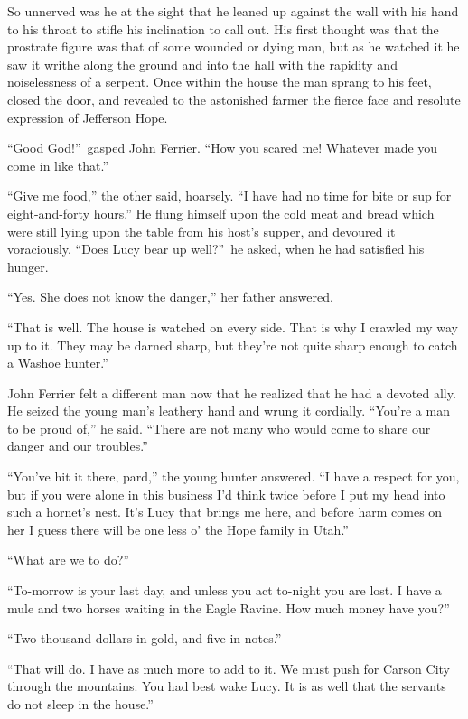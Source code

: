 \documentclass[12pt,english,oneside]{book}
\begin{document}
So unnerved was he at the sight that he leaned up against the wall
with his hand to his throat to stifle his inclination to call out.
His first thought was that the prostrate figure was that of some wounded
or dying man, but as he watched it he saw it writhe along the ground
and into the hall with the rapidity and noiselessness of a serpent.
Once within the house the man sprang to his feet, closed the door,
and revealed to the astonished farmer the fierce face and resolute
expression of Jefferson Hope.

{}``Good God!''\ gasped John Ferrier. {}``How you scared me! Whatever
made you come in like that.''

{}``Give me food,'' the other said, hoarsely. {}``I have had no
time for bite or sup for eight-and-forty hours.'' He flung himself
upon the cold meat and bread which were still lying upon the table
from his host's supper, and devoured it voraciously. {}``Does Lucy
bear up well?''\ he asked, when he had satisfied his hunger.

{}``Yes. She does not know the danger,'' her father answered.

{}``That is well. The house is watched on every side. That is why
I crawled my way up to it. They may be darned sharp, but they're not
quite sharp enough to catch a Washoe hunter.''

John Ferrier felt a different man now that he realized that he had
a devoted ally. He seized the young man's leathery hand and wrung
it cordially. {}``You're a man to be proud of,'' he said. {}``There
are not many who would come to share our danger and our troubles.''

{}``You've hit it there, pard,'' the young hunter answered. {}``I
have a respect for you, but if you were alone in this business I'd
think twice before I put my head into such a hornet's nest. It's Lucy
that brings me here, and before harm comes on her I guess there will
be one less o' the Hope family in Utah.''

{}``What are we to do?''

{}``To-morrow is your last day, and unless you act to-night you are
lost. I have a mule and two horses waiting in the Eagle Ravine. How
much money have you?''

{}``Two thousand dollars in gold, and five in notes.''

{}``That will do. I have as much more to add to it. We must push
for Carson City through the mountains. You had best wake Lucy. It
is as well that the servants do not sleep in the house.''
\end{document}
